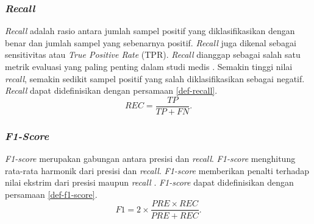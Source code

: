 \subsubsection{\textit{Recall}}
\label{subsubsec: landasan-recall}
\textit{Recall} adalah rasio antara jumlah sampel positif yang diklasifikasikan dengan benar dan jumlah sampel yang sebenarnya positif.
\textit{Recall} juga dikenal sebagai sensitivitas atau \textit{True Positive Rate} (TPR).
\textit{Recall} dianggap sebagai salah satu metrik evaluasi yang paling penting dalam studi medis \parencite{hicksEvaluationMetricsMedical2022}.
Semakin tinggi nilai \textit{recall}, semakin sedikit sampel positif yang salah diklasifikasikan sebagai negatif.
\textit{Recall} dapat didefinisikan dengan persamaan \ref{def-recall}.
\begin{equation}
    REC = \frac{TP}{TP + FN}.
    \label{def-recall}
\end{equation}

\subsubsection{\textit{F1-Score}}
\label{subsubsec: landasan-f1-score}
\textit{F1-score} merupakan gabungan antara presisi dan \textit{recall}.
\textit{F1-score} menghitung rata-rata harmonik dari presisi dan \textit{recall}.
\textit{F1-score} memberikan penalti terhadap nilai ekstrim dari presisi maupun \textit{recall} \parencite{hicksEvaluationMetricsMedical2022}.
\textit{F1-score} dapat didefinisikan dengan persamaan \ref{def-f1-score}.
\begin{equation}
    F1 = 2 \times \frac{PRE \times REC}{PRE + REC}.
    \label{def-f1-score}
\end{equation}



